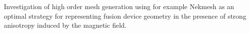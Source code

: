 Investigation of high order mesh generation using for example
Nekmesh as an optimal strategy for representing fusion device
geometry in the presence of strong anisotropy induced by the magnetic field.
